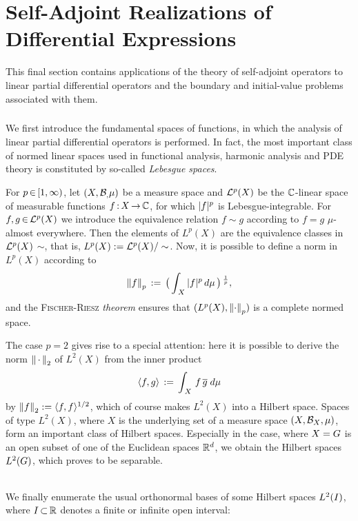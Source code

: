 \documentclass[11pt,twoside]{article}
\begin{document}
\part{Self-Adjoint Realizations of Differential Expressions}
This final section contains applications of the theory
of self-adjoint operators to linear partial differential operators
and the boundary and initial-value problems associated with them.

\subsubsection*{} %
We first introduce the fundamental spaces of functions,
in which the analysis of linear partial differential operators is performed.
In fact,
the most important class of normed linear spaces
used in functional analysis, harmonic analysis and PDE theory
is constituted by so-called \textit{Lebesgue spaces}.

\subparagraph*{}
For $p \xeof [1,\infty)$,
let $(X,\Borel,\mu)$ be a measure space and
$\cal{L}^p(X)$ be the $\C$-linear space of measurable functions
$f\:X \xto \C$,
for which $\abs{f} ^p$ is Lebesgue-integrable.
For $f,g \xeof \cal{L}^p(X)$ we introduce the equivalence relation
$f \sim g$ according to $f=g$ $\mu$-almost everywhere.
Then the elements of $L^p(X)$ are
the equivalence classes in $\cal{L}^p(X)$ {\wrt} $\sim$,
that is,
$L^p(X) := \cal{L}^p(X) / \sim$.
Now,
it is possible to define a norm in $L^p(X)$ according to
\[
\norm{f}_p
\eqdef
\big( \int_{\,X} \, \abs{f} ^p \, d\mu \,\big) \, ^{\frac{1}{p}},
\]
and the \textsc{Fischer-Riesz} \textit{theorem} ensures 
that $(L^p(X),\norm{\cdot}_p)$ is a complete normed space.

\subparagraph*{} %
The case $p=2$ gives rise to a special attention:
here it is possible to derive the norm $\norm{\,\cdot\,}_2$ of $L^2(X)$
from the inner product
\[
\scalar{f}{g} \eqdef \int_{\,X} \, f \, \overline{g} \; d\mu
\]
by $\norm{f}_2 := \scalar{f}{f} ^{1/2}$,
which of course makes $L^2(X)$ into a Hilbert space.
Spaces of type $L^2(X)$,
where $X$ is the underlying set of a measure space $(X,\Borel{X},\mu)$,
form an important class of Hilbert spaces.
Especially in the case,
where $X=\G$ is an open subset of one of the Euclidean spaces $\Rd$,
we obtain the Hilbert spaces $\Lh$,
which proves to be separable.

\paragraph*{} %
We finally enumerate the usual orthonormal bases
of some Hilbert spaces $L^2(\J)$,
where $\J \xsubset \R$ denotes a finite or infinite open interval:
\end{document}
